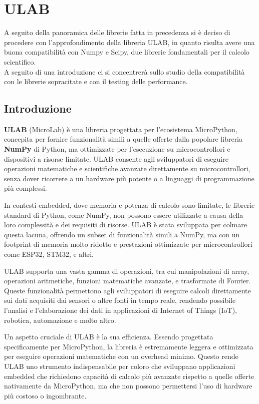 \documentclass[12pt,a4paper]{report}
\begin{document}
\chapter{ULAB}\label{ulab}

A seguito della panoramica delle librerie fatta in precedenza si è
deciso di procedere con l'approfondimento della libreria
ULAB, in quanto risulta avere una buona compatibilità con Numpy e Scipy,
due librerie fondamentali per il calcolo scientifico.\\
A seguito di una introduzione ci si concentrerà sullo studio della
compatibilità con le librerie sopracitate e con il testing delle
performance.

\section{Introduzione}\label{introduzione-1}

\textbf{ULAB} (MicroLab) è una libreria progettata per
l'ecosistema MicroPython, concepita per fornire
funzionalità simili a quelle offerte dalla popolare libreria
\textbf{NumPy} di Python, ma ottimizzate per
l'esecuzione su microcontrollori e dispositivi a risorse
limitate. ULAB consente agli sviluppatori di eseguire operazioni
matematiche e scientifiche avanzate direttamente su microcontrollori,
senza dover ricorrere a un hardware più potente o a linguaggi di
programmazione più complessi.

In contesti embedded, dove memoria e potenza di calcolo sono limitate,
le librerie standard di Python, come NumPy, non possono essere
utilizzate a causa della loro complessità e dei requisiti di risorse.
ULAB è stata sviluppata per colmare questa lacuna, offrendo un subset di
funzionalità simili a NumPy, ma con un footprint di memoria molto
ridotto e prestazioni ottimizzate per microcontrollori come ESP32,
STM32, e altri.

ULAB supporta una vasta gamma di operazioni, tra cui manipolazioni di
array, operazioni aritmetiche, funzioni matematiche avanzate, e
trasformate di Fourier. Queste funzionalità permettono agli sviluppatori
di eseguire calcoli direttamente sui dati acquisiti dai sensori o altre
fonti in tempo reale, rendendo possibile l'analisi e
l'elaborazione dei dati in applicazioni di Internet of
Things (IoT), robotica, automazione e molto altro.

Un aspetto cruciale di ULAB è la sua efficienza. Essendo progettata
specificamente per MicroPython, la libreria è estremamente leggera e
ottimizzata per eseguire operazioni matematiche con un overhead minimo.
Questo rende ULAB uno strumento indispensabile per coloro che sviluppano
applicazioni embedded che richiedono capacità di calcolo più avanzate
rispetto a quelle offerte nativamente da MicroPython, ma che non possono
permettersi l'uso di hardware più costoso o ingombrante.
\end{document}
